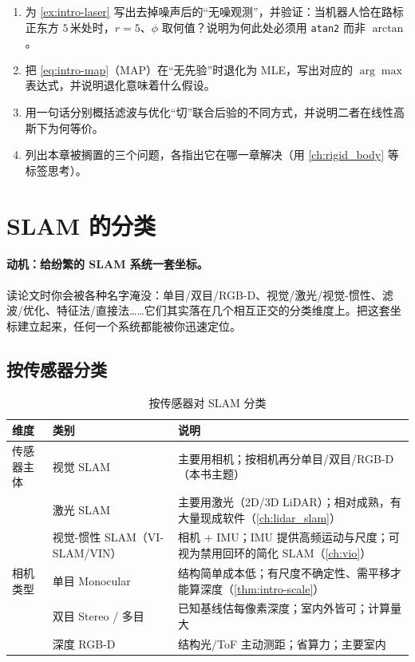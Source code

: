 \begin{practice}
\begin{enumerate}
  \item 为 \cref{ex:intro-laser} 写出去掉噪声后的“无噪观测”，并验证：当机器人恰在路标正东方 $5\,$米处时，$r=5$、$\phi$ 取何值？说明为何此处必须用 \texttt{atan2} 而非 $\arctan$。
  \item 把 \cref{eq:intro-map}（MAP）在“无先验”时退化为 MLE，写出对应的 $\arg\max$ 表达式，并说明退化意味着什么假设。
  \item 用一句话分别概括滤波与优化“切”联合后验的不同方式，并说明二者在线性高斯下为何等价。
  \item 列出本章被搁置的三个问题，各指出它在哪一章解决（用 \cref{ch:rigid_body} 等标签思考）。
\end{enumerate}
\end{practice}

\section{SLAM 的分类}
\label{sec:intro-class}

\paragraph{动机：给纷繁的 SLAM 系统一套坐标。}
读论文时你会被各种名字淹没：单目/双目/RGB-D、视觉/激光/视觉-惯性、滤波/优化、特征法/直接法……它们其实落在几个相互正交的分类维度上。把这套坐标建立起来，任何一个系统都能被你迅速定位。

\subsection{按传感器分类}
\label{sec:intro-by-sensor}
\begin{table}[H]\centering\small
\caption{按传感器对 SLAM 分类}
\label{tab:intro-class-sensor}
\begin{tabular}{p{} p{} p{}}
\toprule
维度 & 类别 & 说明 \\
\midrule
传感器主体 & 视觉 SLAM & 主要用相机；按相机再分单目/双目/RGB-D（本书主题） \\
 & 激光 SLAM & 主要用激光（2D/3D LiDAR）；相对成熟，有大量现成软件（\cref{ch:lidar_slam}） \\
 & 视觉-惯性 SLAM（VI-SLAM/VIN） & 相机 + IMU；IMU 提供高频运动与尺度；可视为禁用回环的简化 SLAM（\cref{ch:vio}） \\
相机类型 & 单目 Monocular & 结构简单成本低；有尺度不确定性、需平移才能算深度（\cref{thm:intro-scale}） \\
 & 双目 Stereo / 多目 & 已知基线估每像素深度；室内外皆可；计算量大 \\
 & 深度 RGB-D & 结构光/ToF 主动测距；省算力；主要室内 \\
\bottomrule
\end{tabular}
\end{table}

